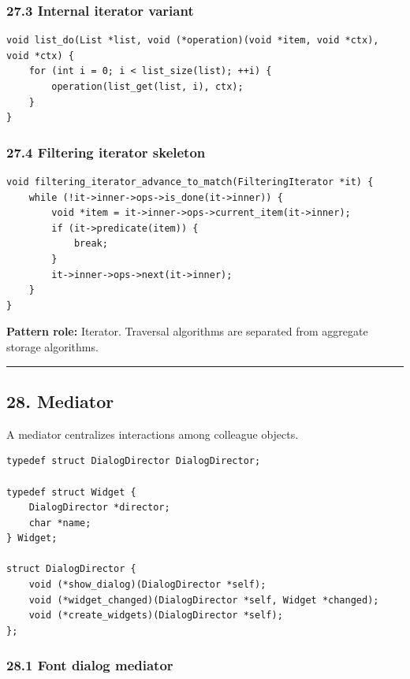 \documentclass[11pt]{article}
\begin{document}
\subsubsection{27.3 Internal iterator variant}\label{internal-iterator-variant}

\begin{verbatim}
void list_do(List *list, void (*operation)(void *item, void *ctx), void *ctx) {
    for (int i = 0; i < list_size(list); ++i) {
        operation(list_get(list, i), ctx);
    }
}
\end{verbatim}

\subsubsection{27.4 Filtering iterator skeleton}\label{filtering-iterator-skeleton}

\begin{verbatim}
void filtering_iterator_advance_to_match(FilteringIterator *it) {
    while (!it->inner->ops->is_done(it->inner)) {
        void *item = it->inner->ops->current_item(it->inner);
        if (it->predicate(item)) {
            break;
        }
        it->inner->ops->next(it->inner);
    }
}
\end{verbatim}

\textbf{Pattern role:} Iterator. Traversal algorithms are separated from aggregate storage algorithms.

\begin{center}\rule{0.5\linewidth}{0.5pt}\end{center}

\subsection{28. Mediator}\label{mediator}

A mediator centralizes interactions among colleague objects.

\begin{verbatim}
typedef struct DialogDirector DialogDirector;

typedef struct Widget {
    DialogDirector *director;
    char *name;
} Widget;

struct DialogDirector {
    void (*show_dialog)(DialogDirector *self);
    void (*widget_changed)(DialogDirector *self, Widget *changed);
    void (*create_widgets)(DialogDirector *self);
};
\end{verbatim}

\subsubsection{28.1 Font dialog mediator}\label{font-dialog-mediator}
\end{document}
